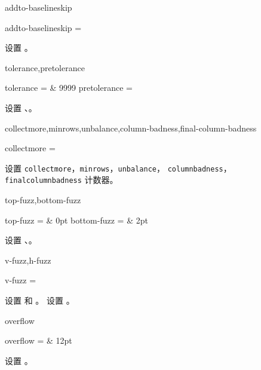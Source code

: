 \documentclass[twoside]{book}
\makeatletter
\newcommand{\sdanger}[1][1]{\par\medskip\noindent\@@line{\hss\Replicate{#1}{\textdbend}\hss}\par}
\makeatother
\begin{document}
\sdanger

\begin{keyval}[path=multicolumns]{addto-baselineskip}
  \begin{syntax}
    addto-baselineskip = 
  \end{syntax}
设置 。%
\end{keyval}

\begin{keyval}[path=multicolumns]{tolerance,pretolerance}
  \begin{syntax}
    tolerance    =  & 9999
    pretolerance = 
  \end{syntax}
设置 、。
\end{keyval}

\begin{keyval}[path=multicolumns]{collectmore,minrows,unbalance,column-badness,final-column-badness}
  \begin{syntax}
    collectmore = 
  \end{syntax}
设置 \texttt{collectmore}，\texttt{minrows}，\texttt{unbalance}，
\texttt{columnbadness}，\texttt{finalcolumnbadness} 计数器。
\end{keyval}

\begin{keyval}[path=multicolumns]{top-fuzz,bottom-fuzz}
  \begin{syntax}
    top-fuzz    =  & 0pt 
    bottom-fuzz =  & 2pt 
  \end{syntax}
设置 、。
\end{keyval}

\begin{keyval}[path=multicolumns]{v-fuzz,h-fuzz}
  \begin{syntax}
    v-fuzz = 
  \end{syntax}
 设置  和 。 设置 。
\end{keyval}

\begin{keyval}[path=multicolumns]{overflow}
  \begin{syntax}
    overflow =  & 12pt 
  \end{syntax}
设置 。
\end{keyval}
\end{document}
